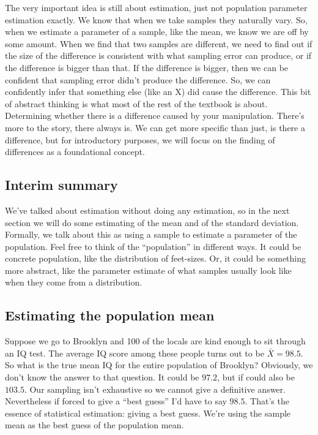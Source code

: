 \documentclass[
]{book}
\begin{document}
The very important idea is still about estimation, just not population parameter estimation exactly. We know that when we take samples they naturally vary. So, when we estimate a parameter of a sample, like the mean, we know we are off by some amount. When we find that two samples are different, we need to find out if the size of the difference is consistent with what sampling error can produce, or if the difference is bigger than that. If the difference is bigger, then we can be confident that sampling error didn't produce the difference. So, we can confidently infer that something else (like an X) did cause the difference. This bit of abstract thinking is what most of the rest of the textbook is about. Determining whether there is a difference caused by your manipulation. There's more to the story, there always is. We can get more specific than just, is there a difference, but for introductory purposes, we will focus on the finding of differences as a foundational concept.

\subsection{Interim summary}\label{interim-summary}

We've talked about estimation without doing any estimation, so in the next section we will do some estimating of the mean and of the standard deviation. Formally, we talk about this as using a sample to estimate a parameter of the population. Feel free to think of the ``population'' in different ways. It could be concrete population, like the distribution of feet-sizes. Or, it could be something more abstract, like the parameter estimate of what samples usually look like when they come from a distribution.

\subsection{Estimating the population mean}\label{estimating-the-population-mean}

Suppose we go to Brooklyn and 100 of the locals are kind enough to sit through an IQ test. The average IQ score among these people turns out to be \(\bar{X}=98.5\). So what is the true mean IQ for the entire population of Brooklyn? Obviously, we don't know the answer to that question. It could be \(97.2\), but if could also be \(103.5\). Our sampling isn't exhaustive so we cannot give a definitive answer. Nevertheless if forced to give a ``best guess'' I'd have to say \(98.5\). That's the essence of statistical estimation: giving a best guess. We're using the sample mean as the best guess of the population mean.
\end{document}
